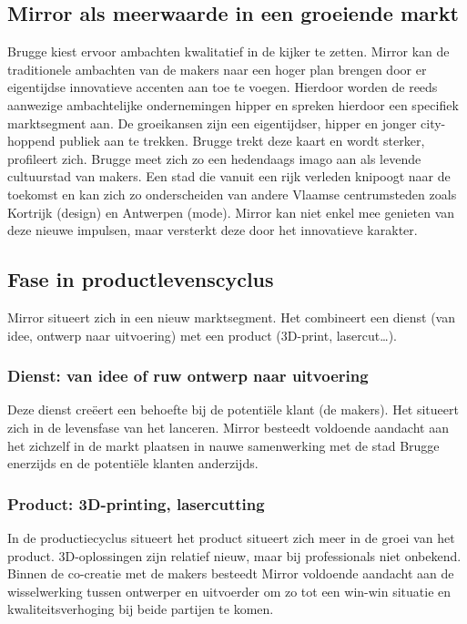 \subsection{Mirror als meerwaarde in een groeiende markt} %
\label{sub:mirror_als_meerwaarde_in_een_groeiende_markt}
Brugge kiest ervoor ambachten kwalitatief in de kijker te zetten. Mirror kan de traditionele ambachten van de makers naar een hoger plan brengen door er eigentijdse innovatieve accenten aan toe te voegen. Hierdoor worden de reeds aanwezige ambachtelijke ondernemingen hipper en spreken hierdoor een specifiek marktsegment aan. De groeikansen zijn een eigentijdser, hipper en jonger city-hoppend publiek aan te trekken. Brugge trekt deze kaart en wordt sterker, profileert zich. Brugge meet zich zo een hedendaags imago aan  als levende cultuurstad van makers. Een stad die vanuit een rijk verleden knipoogt naar de toekomst en kan zich zo onderscheiden van andere Vlaamse centrumsteden zoals Kortrijk (design) en Antwerpen (mode). Mirror kan niet enkel mee genieten van deze nieuwe impulsen, maar versterkt deze door het innovatieve karakter.

\subsection{Fase in productlevenscyclus} %
\label{sub:fase_in_productlevenscyclus}
Mirror situeert zich in een nieuw marktsegment. Het combineert een dienst (van idee, ontwerp naar uitvoering) met een product (3D-print, lasercut\dots).

\subsubsection{Dienst: van idee of ruw ontwerp naar uitvoering} %
\label{ssub:dienst_van_idee_of_ruw_ontwerp_naar_uitvoering}
Deze dienst creëert een behoefte bij de potentiële klant (de makers). Het situeert zich in de levensfase van het lanceren. Mirror besteedt voldoende aandacht aan het zichzelf in de markt plaatsen in nauwe samenwerking met de stad Brugge enerzijds en de potentiële klanten anderzijds.

\subsubsection{Product: 3D-printing, lasercutting} %
\label{ssub:product_3d_printing_lasercutting}
In de productiecyclus situeert het product situeert zich meer in de groei van het product. 3D-oplossingen zijn relatief nieuw, maar bij professionals niet onbekend. Binnen de co-creatie met de makers besteedt Mirror voldoende aandacht aan de wisselwerking tussen ontwerper en uitvoerder om zo tot een win-win situatie en kwaliteitsverhoging bij beide partijen te komen.

